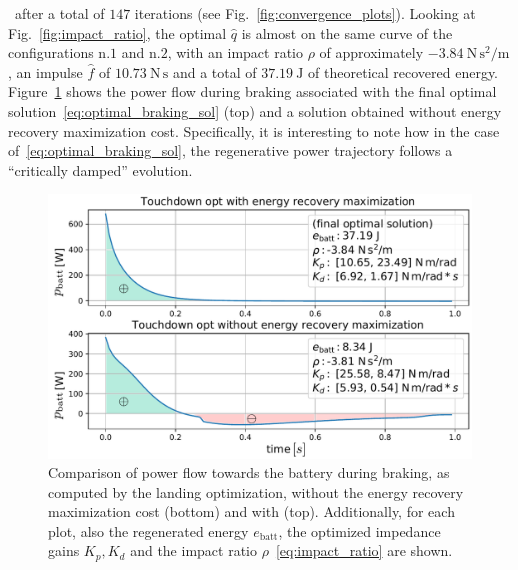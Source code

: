 ~\hspace{-0.55cm}after a total of $147$ iterations (see Fig.~\ref{fig:convergence_plots}). Looking at Fig.~\ref{fig:impact_ratio}, the optimal $\hat{q}$ is almost on the same curve of the configurations n.$1$ and n.$2$, with an impact ratio $\rho$ of approximately $-3.84~\mathrm{N\,s^{2}/m}$, an impulse $\hat{f}$ of $10.73~\mathrm{N\,s}$ and a total of $37.19~\mathrm{J}$ of theoretical recovered energy. Figure~\ref{fig:critically_damped_pow} shows the power flow during braking associated with the final optimal solution~\eqref{eq:optimal_braking_sol} (top) and a solution obtained without energy recovery maximization cost. Specifically, it is interesting to note how in the case of~\eqref{eq:optimal_braking_sol}, the regenerative power trajectory follows a \enquote{critically damped} evolution. 
\begin{figure}[h]
	\centering
	\includegraphics[width=1\columnwidth]{images/critically_damped_vs_no_reg_pow_max.pdf}
	\caption{Comparison of power flow towards the battery during braking, as computed by the landing optimization, without the energy recovery maximization cost (bottom) and with (top). Additionally, for each plot, also the regenerated energy $e_{\mathrm{batt}}$, the optimized impedance gains $K_p, K_d$ and the impact ratio $\rho$~\eqref{eq:impact_ratio} are shown.}
	\label{fig:critically_damped_pow}
\end{figure}

